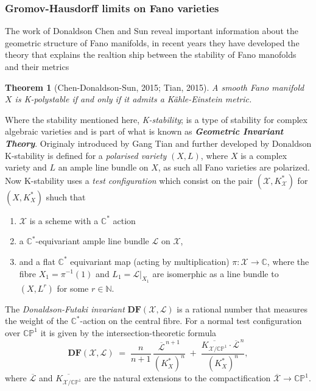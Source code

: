 \documentclass[12pt,twoside,a4paper]{report}
\newtheorem{theorem}{Theorem}[section]
\newcommand{\nat}{\ensuremath{ \mathbb N }}
\newcommand{\co}{\ensuremath{\mathbb C }}
\newcommand{\cp}{\ensuremath{\mathbb{CP}}}
\newcommand{\lsheaf}{\ensuremath{\mathcal L }}
\begin{document}
\subsubsection*{Gromov-Hausdorff limits on Fano varieties}
The work of Donaldson Chen and Sun reveal important information about the geometric structure of Fano manifolds, in recent years they have developed the theory that explains the realtion ship between the stability of Fano manofolds and their metrics  
\begin{theorem}[Chen-Donaldson-Sun, 2015; Tian, 2015]
  A smooth Fano manifold $X$ is K-polystable if and only if it admits a Kähle-Einstein metric.
\end{theorem}
Where the stability mentioned here, \emph{K-stability}; is a type of stability for complex algebraic varieties and is part of  what is known as \emph{\bf Geometric Invariant Theory}. Originaly introduced by Gang Tian and further developed by Donaldson K-stability is defined for a \emph{polarised variety} $(X,L)$, where $X$ is a complex variety and $L$ an ample line bundle on $X$, as such all Fano varieties are polarized. Now K-stability uses a \emph{test configuration} which consist on the pair $(\mathcal{X}, K^{*}_{\mathcal{X}})$ for $(X, K^{*}_X)$ shuch that
  \begin{enumerate}
    \item $\mathcal{X}$ is a scheme with a $\co^{*}$ action 
    \item a $\co^*$-equivariant ample line bundle $\lsheaf$ on $\mathcal{X}$,
    \item and a flat $\co^{*}$ equivariant map (acting by multiplication) $\pi:\mathcal{X}\to\co$, where the fibre $X_1= \pi^{-1}(1)$ and $L_1=\lsheaf|_{X_1}$ are isomerphic as a line bundle to $(X,L^r)$ for some $r\in\nat$.
  \end{enumerate}
  The \emph{Donaldson-Futaki invariant} $\mathbf{{DF}}(\mathcal{X}, \lsheaf)$ is a rational number that measures the weight of the $\co^*$-action on the central fibre. For a normal test configuration over $\cp^1$ it is given by the intersection-theoretic formula
\[
  \mathbf{DF}(\mathcal{X}, \lsheaf) \;=\; \frac{n}{n+1}\,
  \frac{\overline{\lsheaf}^{\,n+1}}{(K^{*}_X)^n}
  \;+\; \frac{\overline{K_{\mathcal{X}/\cp^1}} \cdot \overline{\lsheaf}^{\,n}}
             {(K^{*}_X)^n},
\]
where $\overline{\lsheaf}$ and $\overline{K_{\mathcal{X}/\cp^1}}$ are the natural extensions to the compactification $\overline{\mathcal{X}} \to \cp^1$.
 
\end{document}
